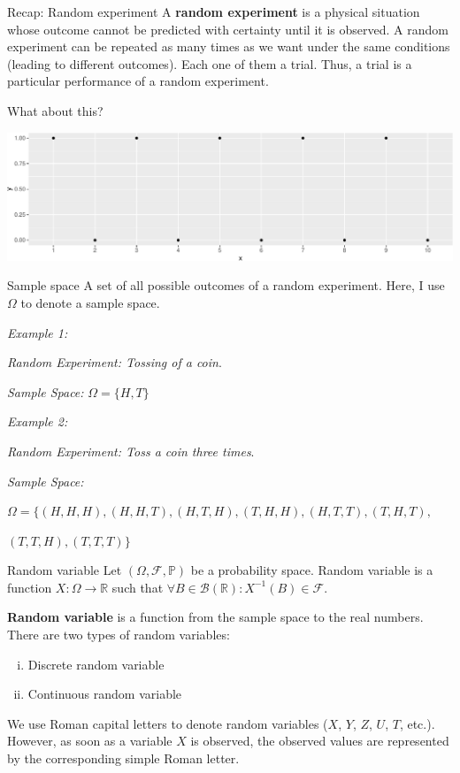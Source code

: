 \documentclass[12pt,ignorenonframetext,]{beamer}
\begin{document}
\begin{frame}{Recap: Random experiment}
\protect\hypertarget{recap-random-experiment}{}
A \textbf{random experiment} is a physical situation whose outcome
cannot be predicted with certainty until it is observed. A random
experiment can be repeated as many times as we want under the same
conditions (leading to different outcomes). Each one of them a trial.
Thus, a trial is a particular performance of a random experiment.

What about this?

\includegraphics{1_stochastic_processes_2021_files/figure-beamer/unnamed-chunk-1-1.pdf}
\end{frame}

\begin{frame}{Sample space}
\protect\hypertarget{sample-space}{}
A set of all possible outcomes of a random experiment. Here, I use
\(\Omega\) to denote a sample space.

\emph{Example 1:}

\emph{Random Experiment: Tossing of a coin}.

\emph{Sample Space:} \(\Omega = \{H, T\}\)

\emph{Example 2:}

\emph{Random Experiment: Toss a coin three times}.

\emph{Sample Space:}

\(\Omega = \{(H, H, H), (H, H, T), (H, T, H), (T, H, H), (H, T, T), (T, H, T),\)

\((T, T, H), (T, T, T)\}\)
\end{frame}

\begin{frame}{Random variable}
\protect\hypertarget{random-variable}{}
Let \((\Omega, \mathscr{F}, \mathbb{P})\) be a probability space. Random
variable is a function \(X: \Omega \rightarrow \mathbb{R}\) such that
\(\forall B \in \mathcal{B}( \mathbb{R} ): X^{-1}(B) \in \mathscr{F}\).

\textbf{Random variable} is a function from the sample space to the real
numbers. There are two types of random variables:

\begin{enumerate}
[i)]
\item
  Discrete random variable
\item
  Continuous random variable
\end{enumerate}

We use Roman capital letters to denote random variables (\(X\), \(Y\),
\(Z\), \(U\), \(T\), etc.). However, as soon as a variable \(X\) is
observed, the observed values are represented by the corresponding
simple Roman letter.
\end{frame}
\end{document}
